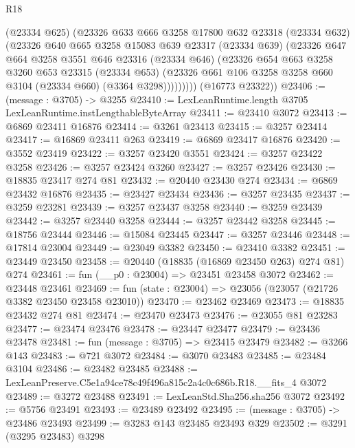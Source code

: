 \begin{lexlean}{R18}
\begin{coremodule}
            (@23334 @625)
            (@23326
              @633
              @666
              @3258
              @17800
              @632
              @23318
              (@23334 @632)
              (@23326
                @640
                @665
                @3258
                @15083
                @639
                @23317
                (@23334 @639)
                (@23326
                  @647
                  @664
                  @3258
                  @3551
                  @646
                  @23316
                  (@23334 @646)
                  (@23326
                    @654
                    @663
                    @3258
                    @3260
                    @653
                    @23315
                    (@23334 @653)
                    (@23326 @661 @106 @3258 @3258 @660 @3104 (@23334 @660) (@3364 @3298)))))))))
      (@16773 @23322))
@23406 := (message : @3705) -> @3255
@23410 := LexLeanRuntime.length @3705 LexLeanRuntime.instLengthableByteArray
@23411 := @23410 @3072
@23413 := @6869 @23411 @16876
@23414 := @3261 @23413
@23415 := @3257 @23414
@23417 := @16869 @23411 @263
@23419 := @6869 @23417 @16876
@23420 := @3552 @23419
@23422 := @3257 @23420 @3551
@23424 := @3257 @23422 @3258
@23426 := @3257 @23424 @3260
@23427 := @3257 @23426
@23430 := @18835 @23417 @274 @81
@23432 := @20440 @23430 @274
@23434 := @6869 @23432 @16876
@23435 := @23427 @23434
@23436 := @3257 @23435
@23437 := @3259 @23281
@23439 := @3257 @23437 @3258
@23440 := @3259 @23439
@23442 := @3257 @23440 @3258
@23444 := @3257 @23442 @3258
@23445 := @18756 @23444
@23446 := @15084 @23445
@23447 := @3257 @23446
@23448 := @17814 @23004
@23449 := @23049 @3382
@23450 := @23410 @3382
@23451 := @23449 @23450
@23458 := @20440 (@18835 (@16869 @23450 @263) @274 @81) @274
@23461 := fun (__p0 : @23004) => @23451 @23458 @3072
@23462 := @23448 @23461
@23469 := fun (state : @23004) => @23056 (@23057 (@21726 @3382 @23450 @23458 @23010))
@23470 := @23462 @23469
@23473 := @18835 @23432 @274 @81
@23474 := @23470 @23473
@23476 := @23055 @81 @23283
@23477 := @23474 @23476
@23478 := @23447 @23477
@23479 := @23436 @23478
@23481 := fun (message : @3705) => @23415 @23479
@23482 := @3266 @143
@23483 := @721 @3072
@23484 := @3070 @23483
@23485 := @23484 @3104
@23486 := @23482 @23485
@23488 := LexLeanPreserve.C5e1a94ce78c49f496a815c2a4c0c686b.R18.__fits_4 @3072
@23489 := @3272 @23488
@23491 := LexLeanStd.Sha256.sha256 @3072
@23492 := @5756 @23491
@23493 := @23489 @23492
@23495 := (message : @3705) -> @23486 @23493
@23499 := @3283 @143 @23485 @23493 @329
@23502 := @3291 (@3295 @23483) @3298

\end{coremodule}
\end{lexlean}
